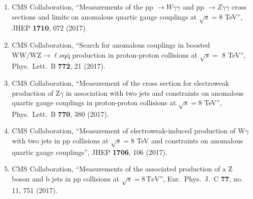 \begin{enumerate}
\item CMS Collaboration, ``Measurements of the pp $\to W\gamma\gamma$ and pp $\to Z\gamma\gamma$ cross sections and limits on anomalous quartic gauge couplings at $ \sqrt{s}=8 $ TeV'', JHEP {\bf 1710}, 072 (2017).

\item CMS Collaboration, ``Search for anomalous couplings in boosted $\mathrm{ WW/WZ }\to\ell\nu\mathrm{ q \bar{q} }$ production in proton-proton collisions at $\sqrt{s} =$ 8 TeV'', Phys.\ Lett.\ B {\bf 772}, 21 (2017).

\item CMS Collaboration, ``Measurement of the cross section for electroweak production of Z$\gamma$ in association with two jets and constraints on anomalous quartic gauge couplings in proton-proton collisions at $\sqrt{s} = 8$ TeV'', Phys.\ Lett.\ B {\bf 770}, 380 (2017).

\item CMS Collaboration, ``Measurement of electroweak-induced production of W$\gamma$ with two jets in pp collisions at $ \sqrt{s}=8 $ TeV and constraints on anomalous quartic gauge couplings'', JHEP {\bf 1706}, 106 (2017).

\item CMS Collaboration, ``Measurements of the associated production of a Z boson and b jets in pp collisions at ${\sqrt{s}} = 8\,\text {TeV} $'', Eur.\ Phys.\ J.\ C {\bf 77}, no. 11, 751 (2017).


\end{enumerate}

